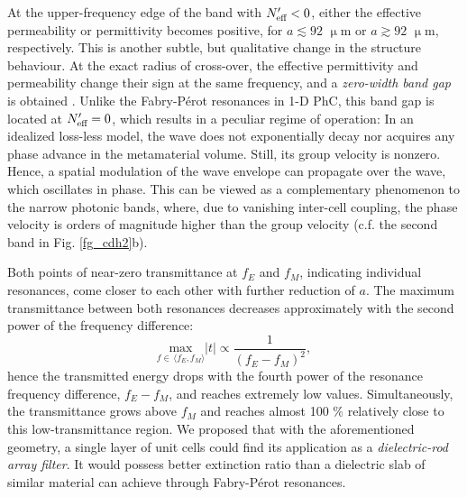 At the upper-frequency edge of the band with $N_{\text{eff} }'<0$, either the effective permeability or permittivity becomes positive, for $a\lesssim 92$ $\upmu$m or  $a\gtrsim 92$ $\upmu$m, respectively. This is another subtle, but qualitative change in the structure behaviour. 
At the exact radius of cross-over, the effective permittivity and permeability change their sign at the same frequency, and a \textit{zero-width band gap} is obtained \cite{croenne2009_subwl_hole}. Unlike the Fabry-Pérot resonances in 1-D PhC, this band gap is located at $N_{\text{eff} }'=0$, which results in a peculiar regime of operation: In an idealized loss-less model, the wave does not exponentially decay nor acquires any phase advance in the metamaterial volume. Still, its group velocity is nonzero. Hence, a spatial modulation of the wave envelope can propagate over the wave, which oscillates in phase. This can be viewed as a complementary phenomenon to the narrow photonic bands, where, due to vanishing inter-cell coupling, the phase velocity is orders of magnitude higher than the group velocity (c.f. the second band in Fig. \ref{fg_cdh2}b).

Both points of near-zero transmittance at $f_E$ and $f_M$, indicating individual resonances, come closer to each other with further reduction of $a$. The maximum transmittance between both resonances decreases approximately with the second power of the frequency difference:
\begin{equation} \underset{f \in\,\langle f_E,f_M\rangle}{\text{max}} |t| \propto \frac{1}{(f_E-f_M)^{2}}, \label{eq_fEfM}\end{equation}
hence the transmitted energy drops with the fourth power of the resonance frequency difference, $f_E-f_M$, and reaches extremely low values. Simultaneously, the transmittance grows above $f_M$ and reaches almost 100 \% relatively close to this low-transmittance region. 
We proposed \cite{dominec2014transition} that with the aforementioned geometry, a single layer of unit cells could find its application as a \textit{dielectric-rod array filter}. It would possess better extinction ratio than a dielectric slab of similar material can achieve through Fabry-Pérot resonances.

